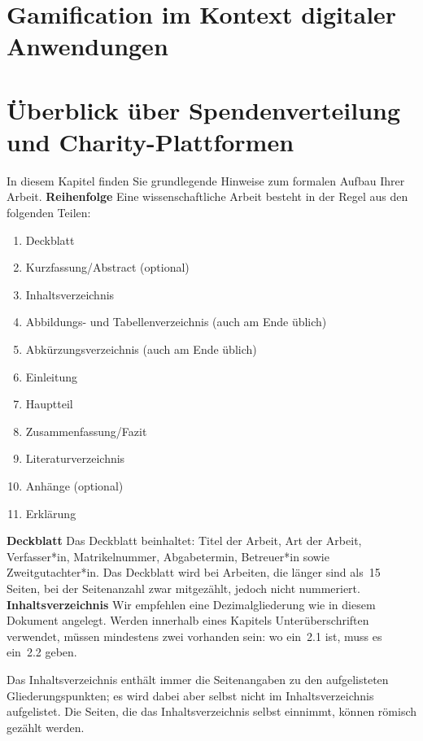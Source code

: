 \section{Gamification im Kontext digitaler Anwendungen}
\section{Überblick über Spendenverteilung und Charity-Plattformen}
\label{chap:formal}
%
In diesem Kapitel finden Sie grundlegende Hinweise zum formalen Aufbau Ihrer Arbeit.
%
\textbf{Reihenfolge}
\label{sec:aufbau}
Eine wissenschaftliche Arbeit besteht in der Regel aus den folgenden Teilen:
%
\begin{enumerate}
 \item Deckblatt
 \item Kurzfassung/Abstract (optional)
 \item Inhaltsverzeichnis
 \item Abbildungs- und Tabellenverzeichnis (auch am Ende üblich)
 \item Abkürzungsverzeichnis (auch am Ende üblich)
 \item Einleitung
 \item Hauptteil
 \item Zusammenfassung/Fazit
 \item Literaturverzeichnis
 \item Anhänge (optional)
 \item Erklärung
\end{enumerate}
%
%
\textbf{Deckblatt}
Das Deckblatt beinhaltet: Titel der Arbeit, Art der Arbeit, Verfasser*in, Matrikelnummer, Abgabetermin, Betreuer*in sowie Zweitgutachter*in. Das Deckblatt wird bei Arbeiten, die länger sind als~15 Seiten, bei der Seitenanzahl zwar mitgezählt, jedoch nicht nummeriert.
%
%
\textbf{Inhaltsverzeichnis}
\label{sec:listOfContents}
Wir empfehlen eine Dezimalgliederung wie in diesem Dokument angelegt. Werden innerhalb eines Kapitels Unterüberschriften verwendet, müssen mindestens zwei vorhanden sein: wo ein~2.1 ist, muss es ein~2.2 geben.
\par
Das Inhaltsverzeichnis enthält immer die Seitenangaben zu den aufgelisteten Gliederungspunkten; es wird dabei aber selbst nicht im Inhaltsverzeichnis aufgelistet. Die Seiten, die das Inhaltsverzeichnis selbst einnimmt, können römisch gezählt werden.
\par
